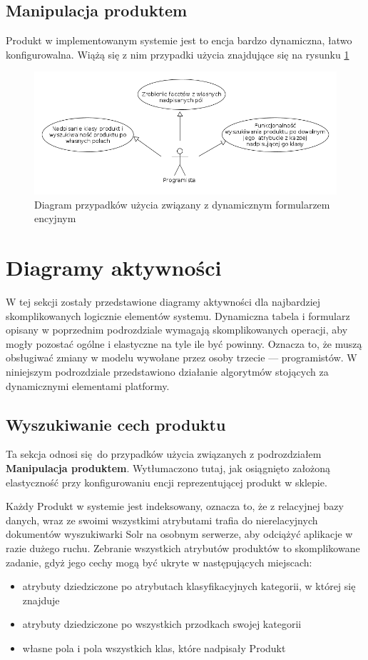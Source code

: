 \subsection{Manipulacja produktem}
Produkt w implementowanym systemie jest to encja bardzo dynamiczna, łatwo konfigurowalna. Wiążą się z nim przypadki użycia znajdujące się na rysunku \ref{manipProd}
\begin{figure}[H]
	\begin{center}
		\includegraphics[scale=0.5]{manipProd.png}
	\end{center}
	\caption{{\color{black}Diagram przypadków użycia związany z dynamicznym formularzem encyjnym}} \label{manipProd}
\end{figure}

\section{Diagramy aktywności}
W tej sekcji zostały przedstawione diagramy aktywności dla najbardziej skomplikowanych logicznie elementów systemu. Dynamiczna tabela i formularz opisany w poprzednim podrozdziale wymagają skomplikowanych operacji, aby mogły pozostać ogólne i elastyczne na tyle ile być powinny. Oznacza to, że muszą obsługiwać zmiany w modelu wywołane przez osoby trzecie — programistów. W niniejszym podrozdziale przedstawiono działanie algorytmów stojących za dynamicznymi elementami platformy.

\subsection{Wyszukiwanie cech produktu}
Ta sekcja odnosi się do przypadków użycia związanych z podrozdziałem \textbf{Manipulacja produktem}. Wytłumaczono tutaj, jak osiągnięto założoną elastyczność przy konfigurowaniu encji reprezentującej produkt w sklepie. 

Każdy Produkt w systemie jest indeksowany, oznacza to, że z relacyjnej bazy danych, wraz ze swoimi wszystkimi atrybutami trafia do nierelacyjnych dokumentów wyszukiwarki Solr na osobnym serwerze, aby odciążyć aplikacje w razie dużego ruchu. Zebranie wszystkich atrybutów produktów to skomplikowane zadanie, gdyż jego cechy mogą być ukryte w następujących miejscach: 
\begin{itemize}
	\item atrybuty dziedziczone po atrybutach klasyfikacyjnych kategorii, w której się znajduje
	\item atrybuty dziedziczone po wszystkich przodkach swojej kategorii
	\item własne pola i pola wszystkich klas, które nadpisały Produkt 
\end{itemize}  

